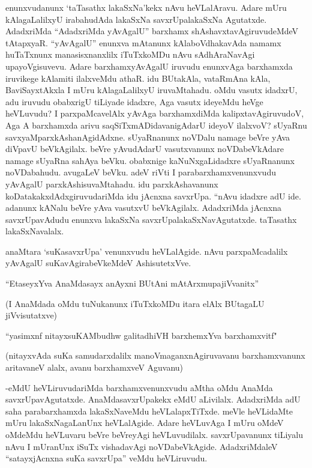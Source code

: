 enunxvudanunx `taTasathx lakaSxNa'kekx nAvu heVLalAravu. Adare mUru kAlagaLalilxyU irabahudAda lakaSxNa savxrUpalakaSxNa Agutatxde. AdadxriMda ``AdadxriMda yAvAgalU'' barxhamx shAshavxtavAgiruvudeMdeV tAtapxyaR. ``yAvAgalU'' enunxva mAtanunx kAlaboVdhakavAda namamx huTaTxnunx manasisxnanxlilx iTuTxkoMDu nAvu sAdhAraNavAgi upayoVgisuvevu. Adare barxhamxyAvAgalU iruvudu enunxvAga barxhamxda iruvikege kAlamiti ilalxveMdu athaR. idu BUtakAla, vataRmAna kAla, BaviSayxtAkxla I mUru kAlagaLalilxyU iruvaMtahadu. oMdu vasutx idadxrU, adu iruvudu obabxrigU tiLiyade idadxre, Aga vasutx ideyeMdu heVge heVLuvudu? I parxpaMcavelAlx yAvAga barxhamxdiMda kalipxtavAgiruvudoV, Aga A barxhamxda arivu saqSiTxmADidavanigAdarU ideyoV ilalxvoV? sUyaRnu savxyaMparxkAshanAgidAdxne. sUyaRnanunx noVDalu namage beVre yAva diVpavU beVkAgilalx. beVre yAvudAdarU vasutxvanunx noVDabeVkAdare namage sUyaRna sahAya beVku. obabxnige kaNuNxgaLidadxre sUyaRnanunx noVDabahudu. avugaLeV beVku. adeV riVti I parabarxhamxvenunxvudu yAvAgalU parxkAshisuvaMtahadu. idu parxkAshavanunx koDatakakxdAdxgiruvudariMda idu jAcnxna savxrUpa. ``nAvu idadxre adU ide. adanunx kANalu beVre yAva vasutxvU beVkAgilalx. AdadxriMda jAcnxna savxrUpavAdudu enunxva lakaSxNa savxrUpalakaSxNavAgutatxde. taTasathx lakaSxNavalalx.

anaMtara `suKasavxrUpa' venunxvudu heVLalAgide. nAvu parxpaMcadalilx yAvAgalU suKavAgirabeVkeMdeV AshisutetxVve.

\begin{shloka}
``EtaseyxYva AnaMdasayx anAyxni BUtAni mAtArxmupajiVvanitx''
\end{shloka}

(I AnaMdada oMdu tuNukanunx iTuTxkoMDu itara elAlx BUtagaLU jiVvisutatxve)

\begin{shloka}
``yasimxnf nitayxsuKAMbudhw galitadhiVH barxhemxYva barxhamxvitf"
\end{shloka}

(nitayxvAda suKa samudarxdalilx manoVmaganxnAgiruvavanu barxhamxvanunx aritavaneV alalx, avanu barxhamxveV Aguvanu)


-eMdU heVLiruvudariMda barxhamxvenunxvudu aMtha oMdu AnaMda savxrUpavAgutatxde. AnaMdasavxrUpakekx eMdU aLivilalx. AdadxriMda adU saha parabarxhamxda lakaSxNaveMdu heVLalapxTiTxde. meVle heVLidaMte mUru lakaSxNagaLanUnx heVLalAgide. Adare heVLuvAga I mUru oMdeV oMdeMdu heVLuvaru beVre beVreyAgi heVLuvudilalx. savxrUpavanunx tiLiyalu nAvu I mUranUnx iSuTx vishadavAgi noVDabeVkAgide. AdadxriMdaleV ``satayxjAcnxna suKa savxrUpa'' veMdu heVLiruvudu. 


